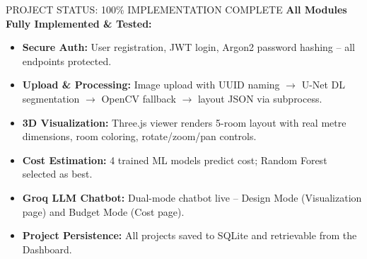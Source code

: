\documentclass[aspectratio=169]{beamer}
\begin{document}
\begin{frame}{PROJECT STATUS: 100\% IMPLEMENTATION COMPLETE}
\textbf{All Modules Fully Implemented \& Tested:}
\begin{itemize}
    \item[\ding{51}] \textbf{Secure Auth:} User registration, JWT login, Argon2 password hashing -- all endpoints protected.
    \item[\ding{51}] \textbf{Upload \& Processing:} Image upload with UUID naming $\rightarrow$ U-Net DL segmentation $\rightarrow$ OpenCV fallback $\rightarrow$ layout JSON via subprocess.
    \item[\ding{51}] \textbf{3D Visualization:} Three.js viewer renders 5-room layout with real metre dimensions, room coloring, rotate/zoom/pan controls.
    \item[\ding{51}] \textbf{Cost Estimation:} 4 trained ML models predict cost; Random Forest selected as best.
    \item[\ding{51}] \textbf{Groq LLM Chatbot:} Dual-mode chatbot live -- Design Mode (Visualization page) and Budget Mode (Cost page).
    \item[\ding{51}] \textbf{Project Persistence:} All projects saved to SQLite and retrievable from the Dashboard.
\end{itemize}
\end{frame}
\end{document}
